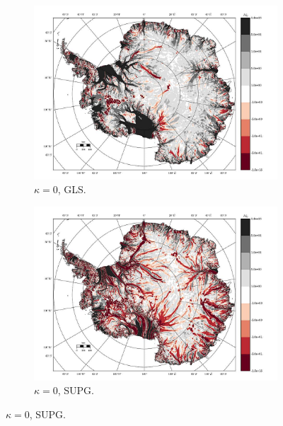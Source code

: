 \begin{figure}

  \centering

  \begin{subfigure}[b]{0.45\linewidth}
    \includegraphics[width=\linewidth]{images/balance_velocity/antarctica/d_U_ob/misfit_10H_kappa_0_GLS.jpg}
  \caption{$\kappa = 0$, GLS.}
  \label{antarctica_bv_image_kappa_0_GLS_U_ob_misfit}
  \end{subfigure}
  \begin{subfigure}[b]{0.45\linewidth}
    \includegraphics[width=\linewidth]{images/balance_velocity/antarctica/d_U_ob/misfit_10H_kappa_0_SUPG.jpg}
  \caption{$\kappa = 0$, SUPG.}
  \label{antarctica_bv_image_kappa_0_SUPG_U_ob_misfit}
  \end{subfigure}


\end{figure}
